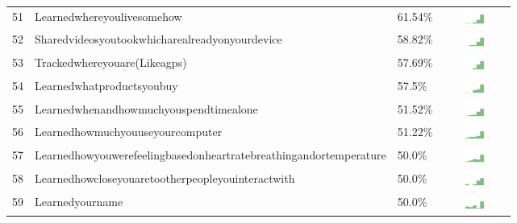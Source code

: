 \documentclass[a4paper,12pt]{article}
\begin{document}
\begin{longtable}{| p{0.5cm} | p{7cm} | p{1cm} | c |}
51 & Learnedwhereyoulivesomehow & 61.54\% & \includegraphics[width = 2cm, height = 0.5cm]{learnedwhereyoulivesomehowFRIENDS} \\  
52 & Sharedvideosyoutookwhicharealreadyonyourdevice & 58.82\% & \includegraphics[width = 2cm, height = 0.5cm]{sharedvideosyoutookwhicharealreadyonyourdeviceFRIENDS} \\  
53 & Trackedwhereyouare(Likeagps) & 57.69\% & \includegraphics[width = 2cm, height = 0.5cm]{trackedwhereyouare(likeaGPS)FRIENDS} \\  
54 & Learnedwhatproductsyoubuy & 57.5\% & \includegraphics[width = 2cm, height = 0.5cm]{learnedwhatproductsyoubuyFRIENDS} \\  
55 & Learnedwhenandhowmuchyouspendtimealone & 51.52\% & \includegraphics[width = 2cm, height = 0.5cm]{learnedwhenandhowmuchyouspendtimealoneFRIENDS} \\  
56 & Learnedhowmuchyouuseyourcomputer & 51.22\% & \includegraphics[width = 2cm, height = 0.5cm]{learnedhowmuchyouuseyourcomputerFRIENDS} \\  
57 & Learnedhowyouwerefeelingbasedonheartratebreathingandortemperature & 50.0\% & \includegraphics[width = 2cm, height = 0.5cm]{learnedhowyouwerefeelingbasedonheartratebreathingandortemperatureFRIENDS} \\  
58 & Learnedhowcloseyouaretootherpeopleyouinteractwith & 50.0\% & \includegraphics[width = 2cm, height = 0.5cm]{learnedhowcloseyouaretootherpeopleyouinteractwithFRIENDS} \\  
59 & Learnedyourname & 50.0\% & \includegraphics[width = 2cm, height = 0.5cm]{learnedyournameFRIENDS} \\  

\end{longtable}
\end{document}

